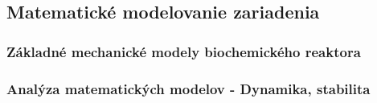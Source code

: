 \subsection{Matematické modelovanie zariadenia}

\subsubsection{Základné mechanické modely biochemického reaktora}

\subsubsection{Analýza matematických modelov - Dynamika, stabilita}